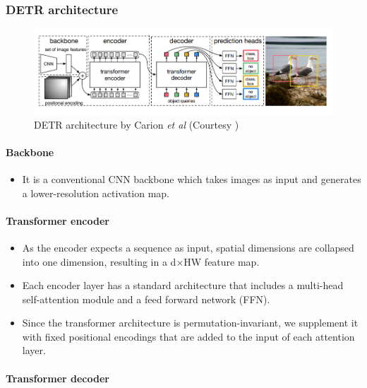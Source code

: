 \subsubsection{DETR architecture}
\begin{figure}[h]
	\centering
	\includegraphics[width=\linewidth]{assets/img/detr-architecture.png}
	\caption{DETR architecture by Carion
		\textit{et al} (Courtesy \cite{detr})}
\end{figure}
\paragraph{Backbone}

\begin{itemize}
	\item It is a conventional CNN backbone which takes images as input and generates a lower-resolution activation map.
\end{itemize}	

\paragraph{Transformer encoder}

\begin{itemize}
	\item As the encoder expects a sequence as input, spatial dimensions are collapsed into one dimension, resulting in a d×HW feature map.
	\item Each encoder layer has a standard architecture that includes a multi-head self-attention module and a feed forward network (FFN).
	\item Since the transformer architecture is permutation-invariant, we supplement it with fixed positional encodings that are added to the input of each attention layer. 
\end{itemize}	

\paragraph{Transformer decoder}

